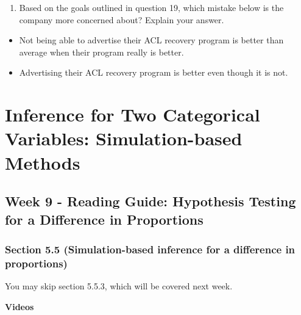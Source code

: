\documentclass[
]{report}
\providecommand{\tightlist}{%
  \setlength{\itemsep}{0pt}\setlength{\parskip}{0pt}}
\begin{document}
\newpage

\begin{enumerate}
\def\labelenumi{\arabic{enumi}.}
\setcounter{enumi}{19}
\tightlist
\item
  Based on the goals outlined in question 19, which mistake below is the company more concerned about? Explain your answer.
\end{enumerate}

\begin{itemize}
\item
  Not being able to advertise their ACL recovery program is better than average when their program really is better.
\item
  Advertising their ACL recovery program is better even though it is not.
\end{itemize}

\vspace{0.8in}

\newpage

\hypertarget{inference-for-two-categorical-variables-simulation-based-methods}{%
\chapter{Inference for Two Categorical Variables: Simulation-based Methods}\label{inference-for-two-categorical-variables-simulation-based-methods}}

\hypertarget{week-9---reading-guide-hypothesis-testing-for-a-difference-in-proportions}{%
\section{Week 9 - Reading Guide: Hypothesis Testing for a Difference in Proportions}\label{week-9---reading-guide-hypothesis-testing-for-a-difference-in-proportions}}

\hypertarget{section-5.5-simulation-based-inference-for-a-difference-in-proportions}{%
\subsection*{Section 5.5 (Simulation-based inference for a difference in proportions)}\label{section-5.5-simulation-based-inference-for-a-difference-in-proportions}}

You may skip section 5.5.3, which will be covered next week.

\textbf{Videos}
\end{document}
